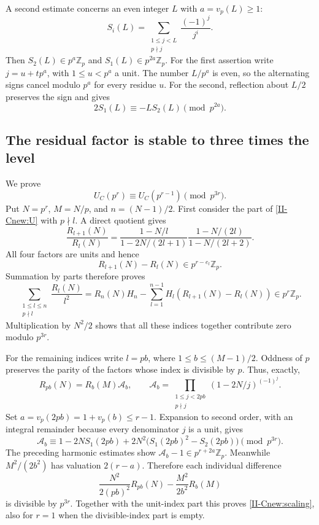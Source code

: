 \documentclass[11pt,letterpaper]{article}
\numberwithin{equation}{section}
\begin{document}
A second estimate concerns an even integer $L$ with $a=v_p(L)\ge1$:
\[
 S_i(L)=\sum_{\substack{1\le j<L\\p\nmid j}}\frac{(-1)^j}{j^i}.
\]
Then $S_2(L)\in p^a\mathbb Z_p$ and
$S_1(L)\in p^{2a}\mathbb Z_p$. For the first assertion write
$j=u+tp^a$, with $1\le u<p^a$ a unit. The number $L/p^a$ is even,
so the alternating signs cancel modulo $p^a$ for every residue $u$.
For the second, reflection about $L/2$ preserves the sign and gives
\[
 2S_1(L)\equiv-LS_2(L)\pmod{p^{2a}}.
\]

\subsection{The residual factor is stable to three times the level}
We prove
\begin{equation}\label{II-Cnew:scaling}
 U_C(p^r)\equiv U_C(p^{r-1})\pmod{p^{3r}}.
\end{equation}
Put $N=p^r$, $M=N/p$, and $n=(N-1)/2$.
First consider the part of \eqref{II-Cnew:U} with $p\nmid l$.
A direct quotient gives
\[
 \frac{R_{l+1}(N)}{R_l(N)}=
 \frac{1-N/l}{1-2N/(2l+1)}
 \frac{1-N/(2l)}{1-N/(2l+2)}.
\]
All four factors are units and hence
\[
 R_{l+1}(N)-R_l(N)\in p^{r-e_l}\mathbb Z_p.
\]
Summation by parts therefore proves
\[
 \sum_{\substack{1\le l\le n\\p\nmid l}}
 \frac{R_l(N)}{l^2}
 =R_n(N)H_n-\sum_{l=1}^{n-1}H_l(R_{l+1}(N)-R_l(N))
 \in p^r\mathbb Z_p.
\]
Multiplication by $N^2/2$ shows that all these indices together
contribute zero modulo $p^{3r}$.

For the remaining indices write $l=pb$, where
$1\le b\le(M-1)/2$. Oddness of $p$ preserves the parity of the
factors whose index is divisible by $p$. Thus, exactly,
\[
 R_{pb}(N)=R_b(M)\mathcal A_b,\qquad
 \mathcal A_b=\prod_{\substack{1\le j<2pb\\p\nmid j}}
 (1-2N/j)^{(-1)^j}.
\]
Set $a=v_p(2pb)=1+v_p(b)\le r-1$. Expansion to second order,
with an integral remainder because every denominator $j$ is a unit,
gives
\[
 \mathcal A_b\equiv
 1-2NS_1(2pb)+2N^2\bigl(S_1(2pb)^2-S_2(2pb)\bigr)
 \pmod{p^{3r}}.
\]
The preceding harmonic estimates show
$\mathcal A_b-1\in p^{r+2a}\mathbb Z_p$.
Meanwhile $M^2/(2b^2)$ has valuation $2(r-a)$. Therefore each
individual difference
\[
 \frac{N^2}{2(pb)^2}R_{pb}(N)
 -\frac{M^2}{2b^2}R_b(M)
\]
is divisible by $p^{3r}$. Together with the unit-index part this proves
\eqref{II-Cnew:scaling}, also for $r=1$ when the divisible-index part is empty.
\end{document}
